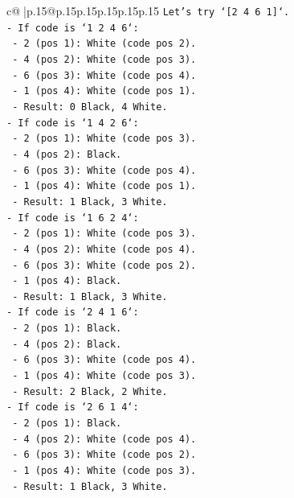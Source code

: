 \documentclass{article}
\begin{document}
{\begin{supertabular}{c@{$\;$}|p{.15\linewidth}@{}p{.15\linewidth}p{.15\linewidth}p{.15\linewidth}p{.15\linewidth}p{.15\linewidth}}
{{{\texttt{Let's try `{[}2 4 6 1{]}`.} \\
\texttt{{-} If code is `1 2 4 6`:} \\
\texttt{  {-} 2 (pos 1): White (code pos 2).} \\
\texttt{  {-} 4 (pos 2): White (code pos 3).} \\
\texttt{  {-} 6 (pos 3): White (code pos 4).} \\
\texttt{  {-} 1 (pos 4): White (code pos 1).} \\
\texttt{  {-} Result: 0 Black, 4 White.} \\
\texttt{{-} If code is `1 4 2 6`:} \\
\texttt{  {-} 2 (pos 1): White (code pos 3).} \\
\texttt{  {-} 4 (pos 2): Black.} \\
\texttt{  {-} 6 (pos 3): White (code pos 4).} \\
\texttt{  {-} 1 (pos 4): White (code pos 1).} \\
\texttt{  {-} Result: 1 Black, 3 White.} \\
\texttt{{-} If code is `1 6 2 4`:} \\
\texttt{  {-} 2 (pos 1): White (code pos 3).} \\
\texttt{  {-} 4 (pos 2): White (code pos 4).} \\
\texttt{  {-} 6 (pos 3): White (code pos 2).} \\
\texttt{  {-} 1 (pos 4): Black.} \\
\texttt{  {-} Result: 1 Black, 3 White.} \\
\texttt{{-} If code is `2 4 1 6`:} \\
\texttt{  {-} 2 (pos 1): Black.} \\
\texttt{  {-} 4 (pos 2): Black.} \\
\texttt{  {-} 6 (pos 3): White (code pos 4).} \\
\texttt{  {-} 1 (pos 4): White (code pos 3).} \\
\texttt{  {-} Result: 2 Black, 2 White.} \\
\texttt{{-} If code is `2 6 1 4`:} \\
\texttt{  {-} 2 (pos 1): Black.} \\
\texttt{  {-} 4 (pos 2): White (code pos 4).} \\
\texttt{  {-} 6 (pos 3): White (code pos 2).} \\
\texttt{  {-} 1 (pos 4): White (code pos 3).} \\
\texttt{  {-} Result: 1 Black, 3 White.} \\
}}}
\end{supertabular}}
\end{document}
